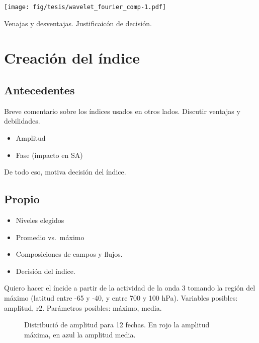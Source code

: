 \documentclass[spanish,a4paper]{book}
\providecommand{\tightlist}{%
  \setlength{\itemsep}{0pt}\setlength{\parskip}{0pt}}
\begin{document}
\texttt{[image: fig/tesis/wavelet\_fourier\_comp-1.pdf]}

Venajas y desventajas. Justificaicón de decisión.

\section{Creación del índice}\label{creacion-del-indice}

\subsection{Antecedentes}\label{antecedentes}

Breve comentario sobre los índices usados en otros lados. Discutir
ventajas y debilidades.

\begin{itemize}
\tightlist
\item
  Amplitud
\item
  Fase (impacto en SA)
\end{itemize}

De todo eso, motiva decisión del índice.

\subsection{Propio}\label{propio}

\begin{itemize}
\tightlist
\item
  Niveles elegidos
\item
  Promedio vs.~máximo
\item
  Composiciones de campos y flujos.
\item
  Decisión del índice.
\end{itemize}

Quiero hacer el íncide a partir de la actividad de la onda 3 tomando la
región del máximo (latitud entre -65 y -40, y entre 700 y 100 hPa).
Variables posibles: amplitud, r2. Parámetros posibles: máximo, media.

\begin{figure*}
\caption{Distribució de amplitud para 12 fechas. En rojo la amplitud máxima, en azul la amplitud media.}\label{fig:max_mean_compara}
\end{figure*}
\end{document}
